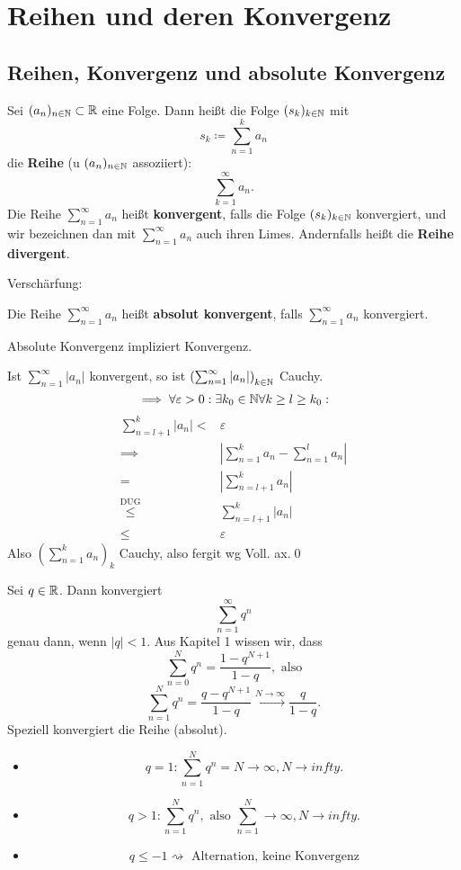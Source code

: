 \section{Reihen und deren Konvergenz}
\subsection{Reihen, Konvergenz und absolute Konvergenz}
\begin{subdefinition}
	Sei $ (a_n)_{n\in\mathbb{N}} \subset \mathbb{R} $ eine Folge. Dann heißt die Folge $ (s_k)_{k\in\mathbb{N}} $ mit
	\[ s_k \coloneqq \sum_{n = 1}^{k} a_n \]
	die \textbf{Reihe} (u $ (a_n)_{n\in\mathbb{N}} $ assoziiert):
	\[ \sum_{k=1}^{\infty} a_n. \]
	Die Reihe $ \sum_{n = 1}^{\infty} a_n $ heißt \textbf{konvergent}, falls die Folge $ (s_k)_{k\in\mathbb{N}} $ konvergiert, und wir bezeichnen dan mit $ \sum_{n=1}^{\infty} a_n $ auch ihren Limes. Andernfalls heißt die \textbf{Reihe divergent}.
\end{subdefinition}
Verschärfung:
\begin{subdefinition}
	Die Reihe $ \sum_{n = 1}^{\infty} a_n $ heißt \textbf{absolut konvergent}, falls $ \sum_{n=1}^{\infty} a_n $ konvergiert.
\end{subdefinition}
\begin{sublemma}
	Absolute Konvergenz impliziert Konvergenz.
	\begin{subproof*}
		Ist $ \sum_{n=1}^{\infty}|a_n| $ konvergent, so ist $ \left( \sum_{n=1}^{\infty}|a_n| \right)_{k\in\mathbb{N}} $ Cauchy.
		\[ \implies \forall \varepsilon > 0 : \exists k_0 \in \mathbb{N} \forall k \geq l \geq k_0 :\]
		\begin{align*}
			\sum_{n=l+1}^{k}|a_n| < &\varepsilon\\
			\implies &\left| \sum_{n=1}^{k}a_n - \sum_{n=1}^{l}a_n \right|\\
			= &\left| \sum_{n = l+1}^{k} a_n \right|\\
			\overset{\text{DUG}}{\leq} &\sum_{n=l+1}^{k} |a_n|\\
			\leq &\varepsilon
		\end{align*}
		Also $ \left(\sum_{n=1}^{k} a_n \right)_k $ Cauchy, also fergit wg Voll. ax.\qed
	\end{subproof*}
\end{sublemma}
\begin{subexample}
	Sei $ q \in \mathbb{R} $. Dann konvergiert
	\[ \sum_{n=1}^{\infty} q^n \]
	genau dann, wenn $ | q | < 1 $. Aus Kapitel 1 wissen wir, dass
	\[ \sum_{n=0}^{N} q^n = \frac{1 - q^{N+1}}{1 - q}, \text{ also} \]
	\[ \sum_{n=1}^{N} q^n = \frac{q - q^{N+1}}{1 - q} \overset{N\to\infty}{\to} \frac{q}{1-q}. \]
	Speziell konvergiert die Reihe (absolut).
	\begin{itemize}
		\item \[ q=1: \sum_{n=1}^{N} q^n = N \to \infty, N \to infty. \]
		\item \[ q>1: \sum_{n=1}^{N} q^n, \text{ also } \sum_{n=1}^{N} \to \infty, N \to infty. \]
		\item \[ q\leq-1 \rightsquigarrow \text{ Alternation, keine Konvergenz} \]
	\end{itemize}
\end{subexample}
